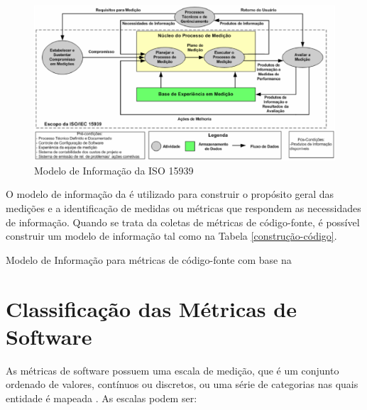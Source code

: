 \begin{figure}[h!]
\centering
	\includegraphics[keepaspectratio=true,scale=0.3]{figuras/processo15939.eps}
	\caption{Modelo de Informação da ISO 15939}
	\label{informação}
\end{figure}
\FloatBarrier

O modelo de informação da  é utilizado para construir o 
propósito geral das medições e a identificação de medidas ou métricas que 
respondem as necessidades de informação. Quando se trata da coletas de métricas de código-fonte, é possível construir um modelo de informação tal como na Tabela \ref{construção-código}.

	\begin{table}[!ht]
	\begin{center}
	
	 
	\caption{Modelo de Informação para métricas de código-fonte com base na 
	}
	\label{construção-código}
	\end{center}
	\end{table}		


\section{Classificação das Métricas de Software}	
\label{Classificação das Métricas de Software}

As métricas de software possuem uma escala de medição, que é um conjunto 
ordenado de valores, contínuos ou discretos, ou uma série de categorias nas 
quais entidade é mapeada \cite{ISO:15939}. As escalas podem ser:

